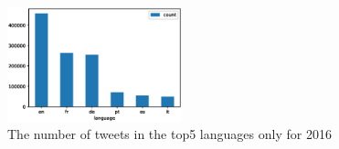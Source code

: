\begin{figure}[h]
  \includegraphics[width=0.45\textwidth]{images/swiss_counts16.eps}
  \caption{The number of tweets in the top5 languages only for 2016}
  \label{swiss_counts16}
\end{figure}

 

